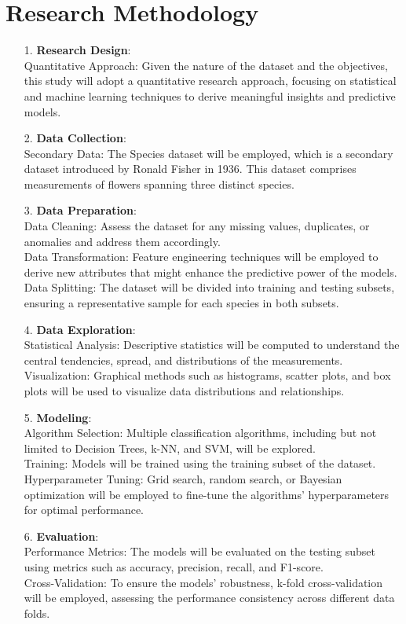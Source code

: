 \documentclass{article}
\begin{document}
\section*{Research Methodology}
\begin{itemize}
    \item[1.]\textbf{Research Design}:\\
Quantitative Approach: Given the nature of the dataset and the objectives, this study will adopt a quantitative research approach, focusing on statistical and machine learning techniques to derive meaningful insights and predictive models.
    \item[2.]\textbf{Data Collection}:\\
Secondary Data: The Species dataset will be employed, which is a secondary dataset introduced by Ronald Fisher in 1936. This dataset comprises measurements of flowers spanning three distinct species.
    \item[3.]\textbf{Data Preparation}:\\
Data Cleaning: Assess the dataset for any missing values, duplicates, or anomalies and address them accordingly.\\
Data Transformation: Feature engineering techniques will be employed to derive new attributes that might enhance the predictive power of the models.\\
Data Splitting: The dataset will be divided into training and testing subsets, ensuring a representative sample for each species in both subsets.
    \item[4.]\textbf{Data Exploration}:\\
Statistical Analysis: Descriptive statistics will be computed to understand the central tendencies, spread, and distributions of the measurements.\\
Visualization: Graphical methods such as histograms, scatter plots, and box plots will be used to visualize data distributions and relationships.
    \item[5.]\textbf{Modeling}:\\
Algorithm Selection: Multiple classification algorithms, including but not limited to Decision Trees, k-NN, and SVM, will be explored.\\
Training: Models will be trained using the training subset of the dataset.\\
Hyperparameter Tuning: Grid search, random search, or Bayesian optimization will be employed to fine-tune the algorithms' hyperparameters for optimal performance.
    \item[6.]\textbf{Evaluation}:\\
Performance Metrics: The models will be evaluated on the testing subset using metrics such as accuracy, precision, recall, and F1-score.\\
Cross-Validation: To ensure the models' robustness, k-fold cross-validation will be employed, assessing the performance consistency across different data folds.
\end{itemize}
\end{document}
